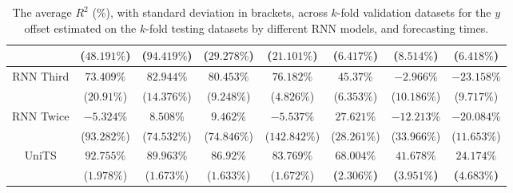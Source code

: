 \begin{table}[!ht]
{\begin{tabular}{|c|c|c|c|c|c|c|c|}
			 & ($48.191\%$) & ($94.419\%$) & ($29.278\%$) & ($21.101\%$) & ($6.417\%$) & ($8.514\%$) & ($6.418\%$) \\ \hline
			\multirow{2}{*}{RNN Third} & $73.409\%$ & $82.944\%$ & $80.453\%$ & $76.182\%$ & $45.37\%$ & $-2.966\%$ & $-23.158\%$ \\
			 & ($20.91\%$) & ($14.376\%$) & ($9.248\%$) & ($4.826\%$) & ($6.353\%$) & ($10.186\%$) & ($9.717\%$) \\ \hline
			\multirow{2}{*}{RNN Twice} & $-5.324\%$ & $8.508\%$ & $9.462\%$ & $-5.537\%$ & $27.621\%$ & $-12.213\%$ & $-20.084\%$ \\
			 & ($93.282\%$) & ($74.532\%$) & ($74.846\%$) & ($142.842\%$) & ($28.261\%$) & ($33.966\%$) & ($11.653\%$) \\ \hline
			\multirow{2}{*}{UniTS} & $92.755\%$ & $89.963\%$ & $86.92\%$ & $83.769\%$ & $\mathbf{68.004\%}$ & $\mathbf{41.678\%}$ & $\mathbf{24.174\%}$ \\
			 & ($1.978\%$) & ($1.673\%$) & ($1.633\%$) & ($1.672\%$) & \textbf{(}$\mathbf{2.306\%}$\textbf{)} & \textbf{(}$\mathbf{3.951\%}$\textbf{)} & \textbf{(}$\mathbf{4.683\%}$\textbf{)} \\ \hline
		\end{tabular}
	}
	\caption{The average $R^{2}$ (\%), with standard deviation in brackets, across $k$-fold validation datasets for the $y$ offset estimated on the $k$-fold testing datasets by different RNN models, and forecasting times.}
	\label{tab:all_latitude_no_abs_R2}
\end{table}